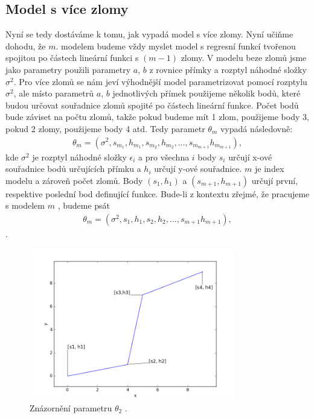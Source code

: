 \documentclass[czech,master,public,dept470,male,cpdeclaration,oneside, python]{diploma}
\begin{document}
\subsection{Model s více zlomy}
Nyní se tedy dostáváme k tomu, jak vypadá model s více zlomy. Nyní učiňme dohodu, že $m.$ modelem budeme vždy myslet model s regresní funkcí tvořenou spojitou po částech lineární funkci s $(m-1)$ zlomy. V modelu beze zlomů jsme jako parametry použili parametry $a$, $b$ z rovnice přímky a rozptyl náhodné složky $\sigma^2$. Pro více zlomů se nám jeví výhodnější model parametrizovat pomocí rozptylu $\sigma^2$, ale místo parametrů $a$, $b$ jednotlivých přímek použijeme několik bodů, které budou určovat souřadnice zlomů spojité po částech lineární funkce.  Počet bodů bude záviset na počtu zlomů, takže pokud budeme mít 1 zlom, použijeme body 3, pokud 2 zlomy, použijeme body 4 atd. Tedy parametr $\theta_m$ vypadá následovně:
\begin{align}\nonumber
\theta_m = (\sigma^2, s_{m_1}, h_{m_1}, s_{m_2}, h_{m_2}, ..., s_{m_{m+1}} h_{m_{m+1}}),
\end{align}
kde $\sigma^2$ je rozptyl náhodné složky $\epsilon_i$ a pro všechna $i$ body $s_i$ určují x-ové souřadnice bodů určujících přímku a $h_i$ určují y-ové souřadnice. $m$ je index modelu a zároveň počet zlomů. Body $(s_1, h_1)$ a $(s_{m+1}, h_{m+1})$ určují první, respektive poslední bod definující funkce. Bude-li z kontextu zřejmé, že pracujeme s modelem $m$ , budeme psát \begin{align}\nonumber
\theta_m = (\sigma^2, s_1, h_1, s_2, h_2, ..., s_{m+1} h_{m+1}),
\end{align}.
\begin{figure}
	[H]\centering\includegraphics[width=0.8\textwidth]{images/model2.png}\caption{Znázornění parametru $\theta_2$	.}
\end{figure}
\end{document}
